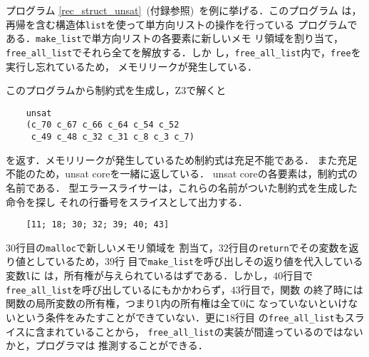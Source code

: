 \begin{example}[型エラースライサー]
  プログラム \ref{rec_struct_unsat}\ (付録参照)\ を例に挙げる．このプログラム
  は，再帰を含む構造体\texttt{list}を使って単方向リストの操作を行っている
  プログラムである．\texttt{make\_list}で単方向リストの各要素に新しいメモ
  リ領域を割り当て，\texttt{free\_all\_list}でそれら全てを解放する．しか
  し，\texttt{free\_all\_list}内で，\texttt{free}を実行し忘れているため，
  メモリリークが発生している．

  このプログラムから制約式を生成し，Z3で解くと
\begin{verbatim}
    unsat
    (c_70 c_67 c_66 c_64 c_54 c_52
     c_49 c_48 c_32 c_31 c_8 c_3 c_7)
\end{verbatim}
  を返す．メモリリークが発生しているため制約式は充足不能である．
  また充足不能のため，unsat coreを一緒に返している．
  unsat coreの各要素は，制約式の名前である．
  型エラースライサーは，これらの名前がついた制約式を生成した命令を探し
  それの行番号をスライスとして出力する．
\begin{verbatim}
    [11; 18; 30; 32; 39; 40; 43]
\end{verbatim}

  $30$行目の\texttt{malloc}で新しいメモリ領域を
  割当て，$32$行目の\texttt{return}でその変数を返り値としているため，$39$行
  目で\texttt{make\_list}を呼び出しその返り値を代入している変数\texttt{l}に
  は，所有権が与えられているはずである．しかし，$40$行目で
  \texttt{free\_all\_list}を呼び出しているにもかかわらず，$43$行目で，関数
  の終了時には関数の局所変数の所有権，つまり\texttt{l}内の所有権は全て$0$に
  なっていないといけないという条件をみたすことができていない．更に$18$行目
  の\texttt{free\_all\_list}もスライスに含まれていることから，
  \texttt{free\_all\_list}の実装が間違っているのではないかと，プログラマは
  推測することができる．
\end{example}